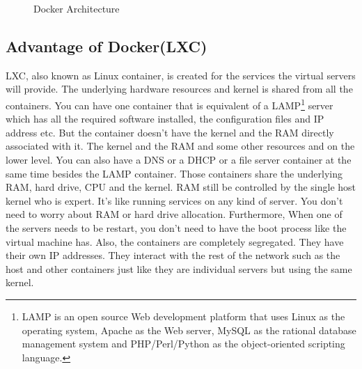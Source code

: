 \documentclass{sig-alternate}
\begin{document}
\begin{figure}[ht]
\centering
{}
\caption{Docker Architecture}
\label{fig:da}
\vskip -6pt
\end{figure}

\subsection{Advantage of Docker(LXC)}
LXC, also known as Linux container, is created for the services the virtual servers will provide. The underlying hardware resources and kernel is shared from all the containers. You can have one container that is equivalent of a LAMP\footnote{LAMP is an open source Web development platform that uses Linux as the operating system, Apache as the Web server, MySQL as the rational database management system and PHP/Perl/Python as the object-oriented scripting language.} server which has all the required software installed, the configuration files and IP address etc. But the container doesn't have the kernel and the RAM directly associated with it. The kernel and the RAM and some other resources and on the lower level. You can also have a DNS or a DHCP or a file server container at the same time besides the LAMP container. Those containers share the underlying RAM, hard drive, CPU and the kernel. RAM still be controlled by the single host kernel who is expert. It's like running services on any kind of server. You don't need to worry about RAM or hard drive allocation. Furthermore, When one of the servers needs to be restart, you don't need to have the boot process like the virtual machine has. Also, the containers are completely segregated. They have their own IP addresses. They interact with the rest of the network such as the host and other containers just like they are individual servers but using the same kernel. 
\end{document}
